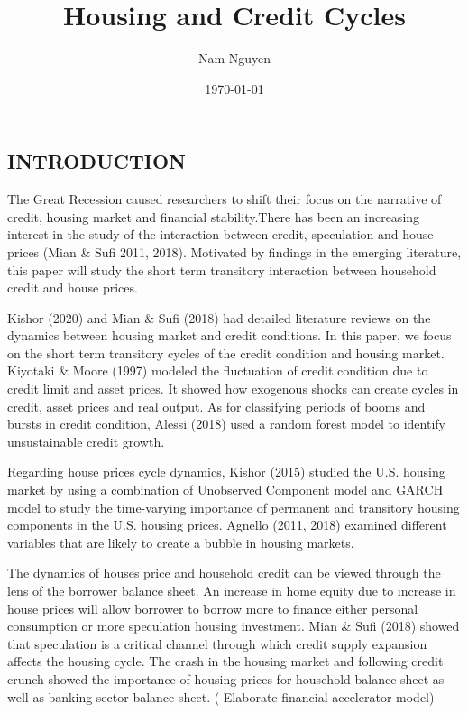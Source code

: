 \documentclass[12pt]{article}
\title{Housing and Credit Cycles}
\author{Nam Nguyen}
\date{\today}
\begin{document}
	\maketitle
	
	\begin{outline}[enumerate]
		
		\section{INTRODUCTION}
	
		The Great Recession caused researchers to shift their focus on the narrative of credit, housing market and financial stability.There has been an increasing interest in the study of the interaction between credit, speculation and house prices (Mian \& Sufi 2011, 2018).  Motivated by findings in the emerging literature, this paper will study the short term transitory interaction between household credit and house prices.
		
		Kishor (2020) and Mian \& Sufi (2018) had detailed literature reviews on the dynamics between housing market and credit conditions. In this paper, we focus on the short term transitory cycles of the credit condition and housing market. Kiyotaki \& Moore (1997) modeled the fluctuation of credit condition due to credit limit and asset prices. It showed how exogenous shocks can create cycles in credit, asset prices and real output. As for classifying periods of booms and bursts in credit condition, Alessi (2018) used a random forest model to identify unsustainable credit growth.
		
		Regarding house prices cycle dynamics, Kishor (2015) studied the U.S. housing market by using a combination of Unobserved Component model and GARCH model to study the time-varying importance of permanent and transitory housing components in the U.S. housing prices. Agnello (2011, 2018) examined different variables that are likely to create a bubble in housing markets.
		
		The dynamics of houses price and household credit can be viewed through the lens of the borrower balance sheet. An increase in home equity due to increase in house prices will allow borrower to borrow more to finance either personal consumption or more speculation housing investment. Mian \& Sufi (2018) showed that speculation  is a critical channel through which credit supply expansion affects the housing cycle. The crash in the housing market and following credit crunch showed the importance of housing prices for household balance sheet as well as banking sector balance sheet. ( Elaborate financial accelerator model)
		

\end{outline}
\end{document}

